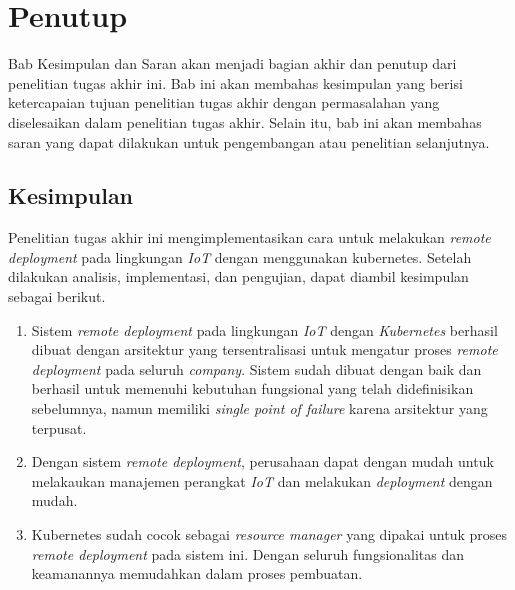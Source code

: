 \chapter{Penutup}

Bab Kesimpulan dan Saran akan menjadi bagian akhir dan penutup dari penelitian tugas akhir ini. Bab ini akan membahas kesimpulan yang berisi ketercapaian tujuan penelitian tugas akhir dengan permasalahan yang diselesaikan dalam penelitian tugas akhir. Selain itu, bab ini akan membahas saran yang dapat dilakukan untuk pengembangan atau penelitian selanjutnya.

\section{Kesimpulan}
Penelitian tugas akhir ini mengimplementasikan cara untuk melakukan \textit{remote deployment} pada lingkungan \textit{IoT} dengan menggunakan kubernetes. Setelah dilakukan analisis, implementasi, dan pengujian, dapat diambil kesimpulan sebagai berikut.
\begin{enumerate}
  \item Sistem \textit{remote deployment} pada lingkungan \textit{IoT} dengan \textit{Kubernetes} berhasil dibuat dengan arsitektur yang tersentralisasi untuk mengatur proses \textit{remote deployment} pada seluruh \textit{company}. Sistem sudah dibuat dengan baik dan berhasil untuk memenuhi kebutuhan fungsional yang telah didefinisikan sebelumnya, namun memiliki \textit{single point of failure} karena arsitektur yang terpusat.
  \item Dengan sistem \textit{remote deployment}, perusahaan dapat dengan mudah untuk melakaukan manajemen perangkat \textit{IoT} dan melakukan \textit{deployment} dengan mudah.
  \item Kubernetes sudah cocok sebagai \textit{resource manager} yang dipakai untuk proses \textit{remote deployment} pada sistem ini. Dengan seluruh fungsionalitas dan keamanannya memudahkan dalam proses pembuatan.
\end{enumerate}

